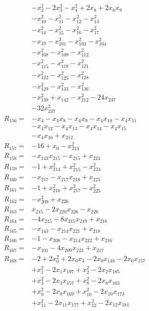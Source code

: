 \begin{align*}
&-x_{2}^{2} -2x_{3}^{2} -x_{4}^{2} +2x_{8} +2x_{8}x_{9}\\
&-x_{10}^{2} -x_{11}^{2} -x_{12}^{2} -x_{13}^{2}\\
&-x_{14}^{2} -x_{15}^{2} -x_{16}^{2} -x_{17}^{2}\\
&-x_{19} -x_{101}^{2} -x_{103}^{2} -x_{104}^{2}\\
&-x_{108}^{2} -x_{109}^{2} -x_{112}^{2}\\
&-x_{115}^{2} -x_{118}^{2} -x_{121}^{2}\\
&-x_{122}^{2} -x_{125}^{2} -x_{128}^{2}\\
&-x_{129}^{2} -x_{133}^{2} -x_{136}^{2}\\
&-x_{139}^{2} +x_{142} -x_{212}^{2} -24x_{237}\\
&-32x_{237}^{2}\\[3pt]
R_{156}={}&-x_{4} -x_{4}x_{8} -x_{4}x_{9} -x_{4}x_{10} -x_{4}x_{11}\\
&-x_{4}x_{12} -x_{4}x_{13} -x_{4}x_{14} -x_{4}x_{15}\\
&-x_{4}x_{16} +x_{212}\\[3pt]
R_{157}={}&-16 +x_{0} -x_{213}^{2}\\[3pt]
R_{158}={}&-x_{143}x_{215} -x_{215} +x_{224}\\[3pt]
R_{159}={}&-1 +x_{214}^{2} +x_{215}^{2} -x_{224}^{2}\\[3pt]
R_{160}={}&-x_{217} -x_{217}x_{218} +x_{225}\\[3pt]
R_{161}={}&-1 +x_{216}^{2} +x_{217}^{2} -x_{225}^{2}\\[3pt]
R_{162}={}&-x_{209}^{2} +x_{226}\\[3pt]
R_{163}={}&x_{215} -2x_{220}x_{226} -x_{226}\\[3pt]
R_{164}={}&-4x_{215} -8x_{215}x_{219} +x_{218}\\[3pt]
R_{165}={}&-x_{143} -x_{214}x_{221} +x_{218}\\[3pt]
R_{166}={}&-1 -x_{208} -x_{214}x_{222} +x_{216}\\[3pt]
R_{167}={}&-x_{101} -4x_{209}x_{223} +x_{217}\\[3pt]
R_{168}={}&-2 +2x_{0}^{2} +2x_{0}x_{3} -2x_{0}x_{148} -2x_{0}x_{157}\\
&+x_{1}^{2} -2x_{1}x_{197} +x_{2}^{2} -2x_{2}x_{185}\\
&+x_{3}^{2} -2x_{3}x_{157} +x_{8}^{2} -2x_{8}x_{163}\\
&+x_{9}^{2} -2x_{9}x_{169} +x_{10}^{2} -2x_{10}x_{173}\\
&+x_{11}^{2} -2x_{11}x_{177} +x_{12}^{2} -2x_{12}x_{181}\\

\end{align*}
